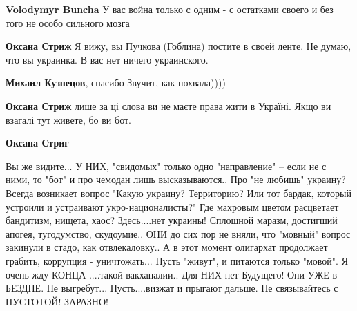 \begin{itemize}
\begin{itemize}
 
\textbf{Volodymyr Buncha} У вас война только с одним - с остатками своего и без того не особо сильного мозга

 
\textbf{Оксана Стриж} Я вижу, вы Пучкова (Гоблина) постите в своей ленте. Не думаю, что вы украинка. В вас нет ничего украинского.

 
\textbf{Михаил Кузнецов}, спасибо \Smiley[1.0][yellow] Звучит, как похвала))))

 
\textbf{Оксана Стриж} лише за ці слова ви не маєте права жити в Україні. Якщо ви взагалі тут живете, бо ви бот.

 
\textbf{Оксана Стриг}

\obeycr
Вы же видите...
У НИХ, "свидомых" только одно "направление" -- если не с ними, то "бот" и про чемодан лишь высказываются..
Про "не любишь" украину?
Всегда возникает вопрос "Какую украину? Территорию? Или тот бардак, который устроили и устраивают укро-националисты?"
Где махровым цветом расцветает бандитизм, нищета, хаос?
Здесь....нет украины!
Сплошной маразм, достигший апогея, тугодумство, скудоумие..
ОНИ до сих пор не вняли, что "мовный" вопрос закинули в стадо, как отвлекаловку..
А в этот момент олигархат продолжает грабить, коррупция - уничтожать...
Пусть "живут", и питаются только "мовой".
Я очень жду КОНЦА ....такой вакханалии..
Для НИХ нет Будущего!
Они УЖЕ в БЕЗДНЕ.
Не выгребут...
Пусть....визжат и прыгают дальше.
Не связывайтесь с ПУСТОТОЙ!
ЗАРАЗНО!
\restorecr

\end{itemize}

 

\end{itemize}
